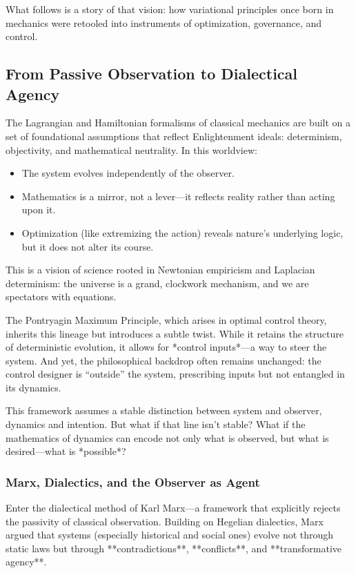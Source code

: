 What follows is a story of that vision: how variational principles once born in mechanics were retooled into instruments of optimization, governance, and control.

\subsection{From Passive Observation to Dialectical Agency}

The Lagrangian and Hamiltonian formalisms of classical mechanics are built on a set of foundational assumptions that reflect Enlightenment ideals: determinism, objectivity, and mathematical neutrality. In this worldview:

\begin{itemize}
	\item The system evolves independently of the observer.  
	\item Mathematics is a mirror, not a lever—it reflects reality rather than acting upon it.  
	\item Optimization (like extremizing the action) reveals nature’s underlying logic, but it does not alter its course.
\end{itemize}

This is a vision of science rooted in Newtonian empiricism and Laplacian determinism: the universe is a grand, clockwork mechanism, and we are spectators with equations.

The Pontryagin Maximum Principle, which arises in optimal control theory, inherits this lineage but introduces a subtle twist. While it retains the structure of deterministic evolution, it allows for *control inputs*—a way to steer the system. And yet, the philosophical backdrop often remains unchanged: the control designer is “outside” the system, prescribing inputs but not entangled in its dynamics.

This framework assumes a stable distinction between system and observer, dynamics and intention. But what if that line isn't stable? What if the mathematics of dynamics can encode not only what is observed, but what is desired—what is *possible*?

\subsubsection{Marx, Dialectics, and the Observer as Agent}

Enter the dialectical method of Karl Marx—a framework that explicitly rejects the passivity of classical observation. Building on Hegelian dialectics, Marx argued that systems (especially historical and social ones) evolve not through static laws but through **contradictions**, **conflicts**, and **transformative agency**.

